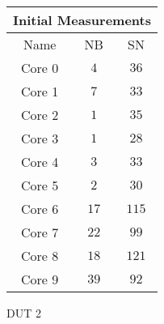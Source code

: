     \begin{tabular}{|| c | c | c ||}
    \hline
    \multicolumn{3}{||c||}{Initial Measurements} \\ [0.5ex] \hline\hline
    Name & NB & SN \\\hline
    Core 0 & $4$ & $36$ \\
    Core 1 & $7$ & $33$ \\
    Core 2 & $1$ & $35$ \\
    Core 3 & $1$ & $28$ \\
    Core 4 & $3$ & $33$ \\
    Core 5 & $2$ & $30$ \\
    Core 6 & $17$ & $115$ \\
    Core 7 & $22$ & $99$ \\
    Core 8 & $18$ & $121$ \\
    Core 9 & $39$ & $92$ \\\hline
    \end{tabular}
    \caption{DUT 2}
    \label{tab:initial-measurements-exp-3-dut-2}
